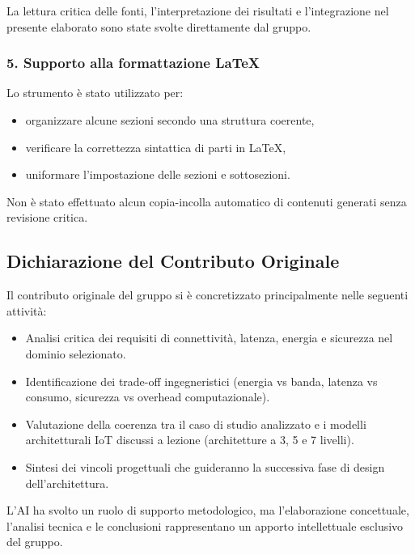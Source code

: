 La lettura critica delle fonti, l'interpretazione dei risultati e l'integrazione nel presente elaborato sono state svolte direttamente dal gruppo.

\subsubsection*{5. Supporto alla formattazione \LaTeX}

Lo strumento è stato utilizzato per:
\begin{itemize}
    \item organizzare alcune sezioni secondo una struttura coerente,
    \item verificare la correttezza sintattica di parti in \LaTeX,
    \item uniformare l'impostazione delle sezioni e sottosezioni.
\end{itemize}

Non è stato effettuato alcun copia-incolla automatico di contenuti generati senza revisione critica.

\subsection{Dichiarazione del Contributo Originale}

Il contributo originale del gruppo si è concretizzato principalmente nelle seguenti attività:
\begin{itemize}
    \item Analisi critica dei requisiti di connettività, latenza, energia e sicurezza nel dominio selezionato.
    \item Identificazione dei trade-off ingegneristici (energia vs banda, latenza vs consumo, sicurezza vs overhead computazionale).
    \item Valutazione della coerenza tra il caso di studio analizzato e i modelli architetturali IoT discussi a lezione (architetture a 3, 5 e 7 livelli).
    \item Sintesi dei vincoli progettuali che guideranno la successiva fase di design dell'architettura.
\end{itemize}

L'AI ha svolto un ruolo di supporto metodologico, ma l'elaborazione concettuale, l'analisi tecnica e le conclusioni rappresentano un apporto intellettuale esclusivo del gruppo.